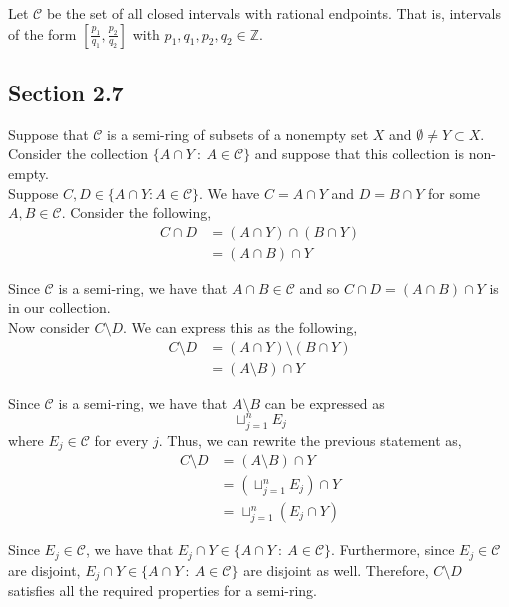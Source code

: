 \documentclass[12pt]{article}
\newenvironment{problem}[2][Problem]{\begin{trivlist}
\item[\hskip \labelsep {\bfseries #1}\hskip \labelsep {\bfseries #2.}]}{\end{trivlist}}
\begin{document}
\begin{problem}{5}
\end{problem}

Let $\mathcal{C}$ be the set of all closed intervals with rational endpoints. That is, intervals of the form $\left[ \frac{p_1}{q_1}, \frac{p_2}{q_2} \right]$ with $p_1, q_1, p_2, q_2 \in \mathbb{Z}$.

\subsection{Section 2.7}

\begin{problem}{1}
\end{problem}

Suppose that $\mathcal{C}$ is a semi-ring of subsets of a nonempty set $X$ and $\emptyset \neq Y \subset X$. Consider the collection $\{A \cap Y \ : \ A \in \mathcal{C} \}$ and suppose that this collection is non-empty.\\

Suppose $C, D \in \{A \cap Y : A \in \mathcal{C} \}$. We have $C = A \cap Y$ and $D = B \cap Y$ for some $A, B \in \mathcal{C}$. Consider the following,
\begin{align*}
C \cap D &= (A \cap Y) \cap (B \cap Y)\\
&= (A \cap B) \cap Y
\end{align*}

Since $\mathcal{C}$ is a semi-ring, we have that $A \cap B \in \mathcal{C}$ and so $C \cap D = (A \cap B) \cap Y$ is in our collection.\\

Now consider $C \setminus D$. We can express this as the following,
\begin{align*}
C \setminus D &= (A \cap Y) \setminus (B \cap Y)\\
&= (A \setminus B) \cap Y
\end{align*}

Since $\mathcal{C}$ is a semi-ring, we have that $A \setminus B$ can be expressed as $$\sqcup_{j=1}^n E_j$$ where $E_j \in \mathcal{C}$ for every $j$. Thus, we can rewrite the previous statement as,
\begin{align*}
C \setminus D &= (A \setminus B) \cap Y\\
&= (\sqcup_{j=1}^n E_j) \cap Y\\
&= \sqcup_{j=1}^n (E_j \cap Y)
\end{align*}

Since $E_j \in \mathcal{C}$, we have that $E_j \cap Y \in \{A \cap Y \ : \ A \in \mathcal{C} \}$. Furthermore, since $E_j \in \mathcal{C}$ are disjoint, $E_j \cap Y \in \{A \cap Y \ : \ A \in \mathcal{C} \}$ are disjoint as well. Therefore, $C \setminus D$ satisfies all the required properties for a semi-ring.\\
\end{document}

